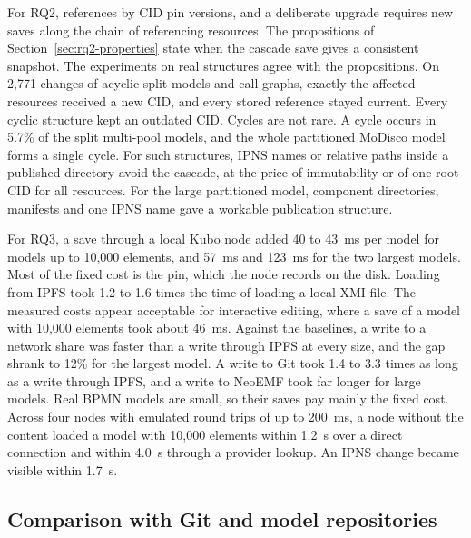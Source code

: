 \documentclass[5p,times,twocolumn]{elsarticle}
\theoremstyle{definition}
\theoremstyle{plain}
\begin{document}
For RQ2, references by CID pin versions, and a deliberate upgrade requires new saves along the chain of referencing resources. The propositions of Section~\ref{sec:rq2-properties} state when the cascade save gives a consistent snapshot. The experiments on real structures agree with the propositions. On 2,771 changes of acyclic split models and call graphs, exactly the affected resources received a new CID, and every stored reference stayed current. Every cyclic structure kept an outdated CID. Cycles are not rare. A cycle occurs in 5.7\% of the split multi-pool models, and the whole partitioned MoDisco model forms a single cycle. For such structures, IPNS names or relative paths inside a published directory avoid the cascade, at the price of immutability or of one root CID for all resources. For the large partitioned model, component directories, manifests and one IPNS name gave a workable publication structure.

For RQ3, a save through a local Kubo node added 40 to 43~ms per model for models up to 10,000 elements, and 57~ms and 123~ms for the two largest models. Most of the fixed cost is the pin, which the node records on the disk. Loading from IPFS took 1.2 to 1.6 times the time of loading a local XMI file. The measured costs appear acceptable for interactive editing, where a save of a model with 10,000 elements took about 46~ms. Against the baselines, a write to a network share was faster than a write through IPFS at every size, and the gap shrank to 12\% for the largest model. A write to Git took 1.4 to 3.3 times as long as a write through IPFS, and a write to NeoEMF took far longer for large models. Real BPMN models are small, so their saves pay mainly the fixed cost. Across four nodes with emulated round trips of up to 200~ms, a node without the content loaded a model with 10,000 elements within 1.2~s over a direct connection and within 4.0~s through a provider lookup. An IPNS change became visible within 1.7~s.

\subsection{Comparison with Git and model repositories}\label{sec:comparison}
\end{document}
